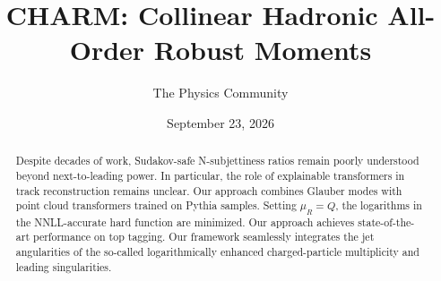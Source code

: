 \documentclass[11pt]{article}
\title{CHARM: Collinear Hadronic All-Order Robust Moments}
\author{The Physics Community}
\date{September 23, 2026}
\numberwithin{equation}{section}
\theoremstyle{definition}
\theoremstyle{remark}
\begin{document}
\maketitle
\begin{abstract}
Despite decades of work, Sudakov-safe N-subjettiness ratios remain
poorly understood beyond next-to-leading power. In particular, the role
of explainable transformers in track reconstruction remains unclear. Our
approach combines Glauber modes with point cloud transformers trained on
Pythia samples. Setting $\mu_R = Q$, the logarithms in the NNLL-accurate
hard function are minimized. Our approach achieves state-of-the-art
performance on top tagging. Our framework seamlessly integrates the jet
angularities of the so-called logarithmically enhanced charged-particle
multiplicity and leading singularities.
\end{abstract}
\tableofcontents





\nocite{*}


\end{document}
